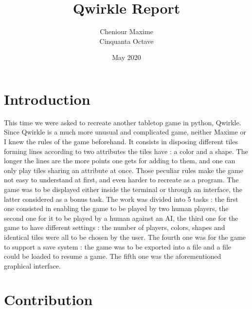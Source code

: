 \documentclass{article}
\title{Qwirkle Report}
\author{Cheniour Maxime \\ Cinquanta Octave}
\date{May 2020}
\begin{document}
\maketitle

\tableofcontents

\section{Introduction}

This time we were asked to recreate another tabletop game in python, Qwirkle. Since Qwirkle is a much more unusual and complicated game, neither Maxime or I knew the rules of the game beforehand. It consists in disposing different tiles forming lines according to two attributes the tiles have : a color and a shape. The longer the lines are the more points one gets for adding to them, and one can only play tiles sharing an attribute at once. Those peculiar rules make the game not easy to understand at first, and even harder to recreate as a program. The game was to be displayed either inside the terminal or through an interface, the latter considered as a bonus task. The work was divided into 5 tasks : the first one consisted in enabling the game to be played by two human players, the second one for it to be played by a human against an AI, the third one for the game to have different settings : the number of players, colors, shapes and identical tiles were all to be chosen by the user. The fourth one was for the game to support a save system : the game was to be exported into a file and a file could be loaded to resume a game. The fifth one was the aforementioned graphical interface.  

\section{Contribution}
\end{document}
